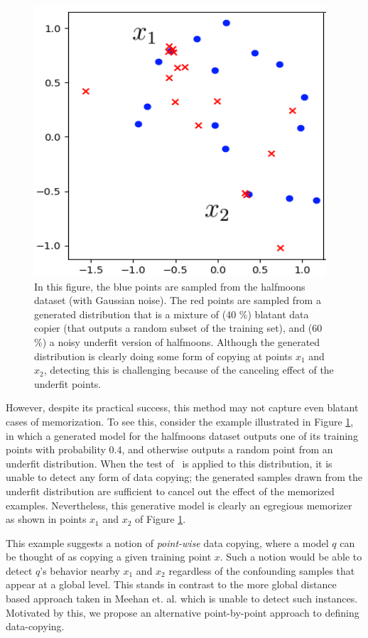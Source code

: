 \begin{figure}[ht]
\centering
	\includegraphics[width=.45\textwidth]{page_2_figure_yo.png}
	\caption{In this figure, the blue points are sampled from the halfmoons dataset (with Gaussian noise). The red points are sampled from a generated distribution that is a mixture of (40 \%) blatant data copier (that outputs a random subset of the training set), and (60 \%) a noisy underfit version of halfmoons. Although the generated distribution is clearly doing some form of copying at points $x_1$ and $x_2$, detecting this is challenging because of the canceling effect of the underfit points.}
	
	\label{fig:page_2_figure}
\end{figure}

However, despite its practical success, this method may not capture even blatant cases of memorization. To see this, consider the example illustrated in Figure \ref{fig:page_2_figure}, in which a generated model for the halfmoons dataset outputs one of its training points with probability $0.4$, and otherwise outputs a random point from an underfit distribution. When the test of~\cite{MCD2020} is applied to this distribution, it is unable to detect any form of data copying; the generated samples drawn from the underfit distribution are sufficient to cancel out the effect of the memorized examples. Nevertheless, this generative model is clearly an egregious memorizer as shown in points $x_1$ and $x_2$ of Figure \ref{fig:page_2_figure}.

This example suggests a notion of \textit{point-wise} data copying, where a model $q$ can be thought of as copying a given training point $x$. Such a notion would be able to detect $q$'s behavior nearby $x_1$ and $x_2$ regardless of the confounding samples that appear at a global level. This stands in contrast to the more global distance based approach taken in Meehan et. al. which is unable to detect such instances. Motivated by this, we propose an alternative point-by-point approach to defining data-copying.

